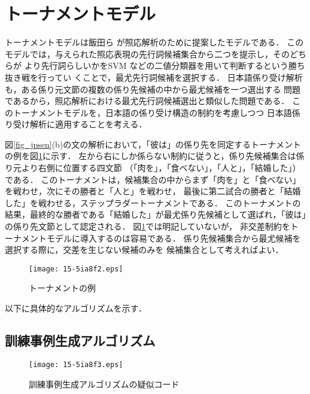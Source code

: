 \documentclass[japanese]{jnlp_1.4}
\begin{document}
\section{トーナメントモデル}


トーナメントモデルは飯田ら  が照応解析のために提案したモデルである．
このモデルでは，与えられた照応表現の先行詞候補集合から二つを提示し，そのどちらが
より先行詞らしいかをSVM などの二値分類器を用いて判断するという勝ち抜き戦を行ってい
くことで，最尤先行詞候補を選択する．
日本語係り受け解析も，ある係り元文節の複数の係り先候補の中から最尤候補を一つ選出する
問題であるから，照応解析における最尤先行詞候補選出と類似した問題である．
このトーナメントモデルを，日本語の係り受け構造の制約を考慮しつつ
日本語係り受け解析に適用することを考える．

図\ref{fig_jpsen}(b)の文の解析において，「彼は」の係り先を同定するトーナメントの例を図\ref{fig_tournament}に示す．
左から右にしか係らない制約に従うと，係り先候補集合は係り元より右側に位置する四文節
（「肉を」，「食べない」，「人と」，「結婚した」）である．
このトーナメントは，候補集合の中からまず「肉を」と「食べない」を戦わせ，次にその勝者と「人と」を戦わせ，
最後に第二試合の勝者と「結婚した」を戦わせる，ステップラダートーナメントである．
このトーナメントの結果，最終的な勝者である「結婚した」が最尤係り先候補として選ばれ，「彼は」の係り先文節として認定される．
図\ref{fig_tournament}では明記していないが，
非交差制約をトーナメントモデルに導入するのは容易である．
係り先候補集合から最尤候補を選択する際に，交差を生じない候補のみを
候補集合として考えればよい．

\begin{figure}[b]
\begin{center}
\texttt{[image: 15-5ia8f2.eps]}
\end{center}
\caption{トーナメントの例}
\label{fig_tournament}
\end{figure}

以下に具体的なアルゴリズムを示す．



\subsection{訓練事例生成アルゴリズム}

\begin{figure}[b]
\begin{center}
\texttt{[image: 15-5ia8f3.eps]}
\end{center}
\caption{訓練事例生成アルゴリズムの疑似コード}
\label{fig_train}
\end{figure}
\end{document}
